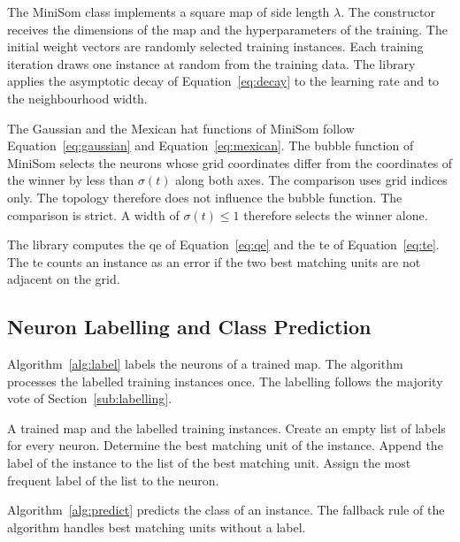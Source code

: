\documentclass[conference]{IEEEtran}
\begin{document}
The MiniSom class implements a square map of side length $\lambda$.
The constructor receives the dimensions of the map and the hyperparameters of the training.
The initial weight vectors are randomly selected training instances.
Each training iteration draws one instance at random from the training data.
The library applies the asymptotic decay of Equation~\eqref{eq:decay} to the learning rate and to the neighbourhood width.

The Gaussian and the Mexican hat functions of MiniSom follow Equation~\eqref{eq:gaussian} and Equation~\eqref{eq:mexican}.
The bubble function of MiniSom selects the neurons whose grid coordinates differ from the coordinates of the winner by less than $\sigma(t)$ along both axes.
The comparison uses grid indices only.
The topology therefore does not influence the bubble function.
The comparison is strict.
A width of $\sigma(t) \leq 1$ therefore selects the winner alone.

The library computes the \gls{qe} of Equation~\eqref{eq:qe} and the \gls{te} of Equation~\eqref{eq:te}.
The \gls{te} counts an instance as an error if the two best matching units are not adjacent on the grid.

\subsection{Neuron Labelling and Class Prediction}
\label{sub:labelimpl}

Algorithm~\ref{alg:label} labels the neurons of a trained map.
The algorithm processes the labelled training instances once.
The labelling follows the majority vote of Section~\ref{sub:labelling}.

\begin{algorithm}[!t]
\caption{Neuron labelling}
\label{alg:label}
\begin{algorithmic}[1]
\REQUIRE A trained map and the labelled training instances.
\STATE Create an empty list of labels for every neuron.
    \STATE Determine the best matching unit of the instance.
    \STATE Append the label of the instance to the list of the best matching unit.
\ENDFOR
{}
    \STATE Assign the most frequent label of the list to the neuron.
\ENDFOR
\end{algorithmic}
\end{algorithm}

Algorithm~\ref{alg:predict} predicts the class of an instance.
The fallback rule of the algorithm handles best matching units without a label.
\end{document}
